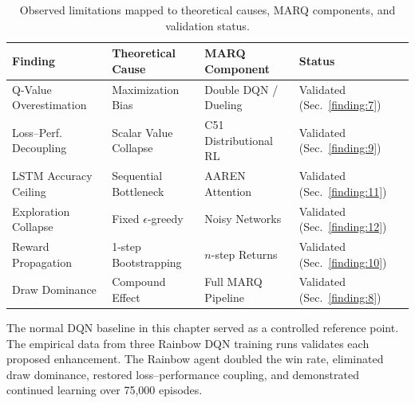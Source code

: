 \begin{table}[htbp]
    \centering
    \caption{Observed limitations mapped to theoretical causes, MARQ components, and validation status.}
    \label{tab:limitation_mapping}
    \begin{tabular}{|p{3cm}|p{3.5cm}|p{3.5cm}|p{2.5cm}|}
        \hline
        \textbf{Finding} & \textbf{Theoretical Cause} & \textbf{MARQ Component} & \textbf{Status} \\
        \hline
        Q-Value Overestimation & Maximization Bias & Double DQN / Dueling & Validated (Sec.~\ref{finding:7}) \\
        \hline
        Loss--Perf. Decoupling & Scalar Value Collapse & C51 Distributional RL & Validated (Sec.~\ref{finding:9}) \\
        \hline
        LSTM Accuracy Ceiling & Sequential Bottleneck & AAREN Attention & Validated (Sec.~\ref{finding:11}) \\
        \hline
        Exploration Collapse & Fixed $\epsilon$-greedy & Noisy Networks & Validated (Sec.~\ref{finding:12}) \\
        \hline
        Reward Propagation & 1-step Bootstrapping & $n$-step Returns & Validated (Sec.~\ref{finding:10}) \\
        \hline
        Draw Dominance & Compound Effect & Full MARQ Pipeline & Validated (Sec.~\ref{finding:8}) \\
        \hline
    \end{tabular}
\end{table}

The normal DQN baseline in this chapter served as a controlled reference point. The empirical data from three Rainbow DQN training runs validates each proposed enhancement. The Rainbow agent doubled the win rate, eliminated draw dominance, restored loss--performance coupling, and demonstrated continued learning over 75,000 episodes.
